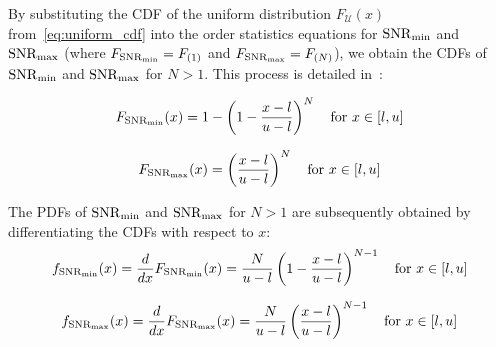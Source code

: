 By substituting the CDF of the uniform distribution \( F_{\mathcal{U}}(x) \) from~\autoref{eq:uniform_cdf} into the
order statistics equations for \( \mathrm{SNR}_{\min} \) and \( \mathrm{SNR}_{\max} \) (where \( F_{\mathrm{SNR}_{\min}} = F_{(1)} \) and \( F_{\mathrm{SNR}_{\max}} = F_{(N)} \)),
we obtain the CDFs of \( \mathrm{SNR}_{\min} \) and \( \mathrm{SNR}_{\max} \) for \( N > 1 \).
This process is detailed in~\cite[Chapter 8.6]{blitzstein2019}:

\begin{equation}
    F_{\mathrm{SNR}_{\min}}(x) = 1 - \left(1 - \frac{x-l}{u-l}\right)^N \quad \text{for } x \in [l, u]
\end{equation}

\begin{equation}
    F_{\mathrm{SNR}_{\max}}(x) = \left(\frac{x-l}{u-l}\right)^N \quad \text{for } x \in [l, u]
\end{equation}

The PDFs of \( \mathrm{SNR}_{\min} \) and \( \mathrm{SNR}_{\max} \) for \( N > 1 \) are subsequently obtained by differentiating the CDFs with respect to \( x \):
\begin{equation}
    f_{\mathrm{SNR}_{\min}}(x) = \frac{d}{dx}F_{\mathrm{SNR}_{\min}}(x) = \frac{N}{u - l} \left(1 - \frac{x - l}{u - l}\right)^{N-1} \quad \text{for } x \in [l, u]
    \label{eq:snrmin_pdf_nge1}
\end{equation}

\begin{equation}
    f_{\mathrm{SNR}_{\max}}(x) = \frac{d}{dx}F_{\mathrm{SNR}_{\max}}(x) = \frac{N}{u - l} \left(\frac{x - l}{u - l}\right)^{N-1} \quad \text{for } x \in [l, u]
    \label{eq:snrmax_pdf_nge1}
\end{equation}


